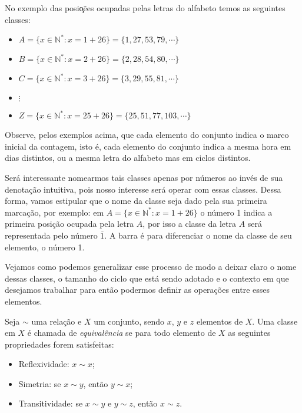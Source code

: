 No exemplo das posi\c{o}\~{e}es ocupadas pelas letras do alfabeto temos as seguintes classes: 

\begin{itemize}
	\item $A=\{x\in\mathbb{N^*}: x=1+26\}=\{1, 27, 53, 79, \cdots\}$ 
	\item $B=\{x\in\mathbb{N^*}: x=2+26\}=\{2, 28, 54, 80, \cdots\}$
	\item $C=\{x\in\mathbb{N^*}: x=3+26\}=\{3, 29, 55, 81, \cdots\}$
	\item $\vdots$
	\item $Z=\{x\in\mathbb{N^*}: x=25+26\}=\{25, 51, 77, 103, \cdots\}$
\end{itemize}

Observe, pelos exemplos acima, que cada elemento do conjunto indica o marco inicial da contagem, isto \'{e}, cada elemento do conjunto indica a mesma hora em dias distintos, ou a mesma letra do alfabeto mas em ciclos distintos.

Ser\'{a} interessante nomearmos tais classes apenas por n\'{u}meros ao inv\'{e}s de sua denota\c{c}\~{a}o intuitiva, pois nosso interesse ser\'{a} operar com essas classes. Dessa forma, vamos estipular que o nome da classe seja dado pela sua 
primeira marca\c{c}\~{a}o, por exemplo: em $A=\{x\in\mathbb{N^*}: x=1+26\}$ o n\'{u}mero 1 indica a primeira posi\c{c}\~{a}o ocupada pela letra $A$, por isso a classe da letra $A$ ser\'{a} representada pelo n\'{u}mero $\overline{1}$. A barra \'{e} 
para diferenciar o nome da classe de seu elemento, o n\'{u}mero 1. 

Vejamos como podemos generalizar esse processo de modo a deixar claro o nome dessas classes, o tamanho do ciclo que est\'a sendo adotado 
e o contexto em que desejamos trabalhar para ent\~{a}o podermos definir as opera\c{c}\~{o}es entre esses elementos.
 

\begin{Df}
	Seja $\sim$ uma rela\c{c}\~{a}o e $X$ um conjunto, sendo $x$, $y$ e $z$ elementos de $X$. 
	Uma classe em $X$ \'{e} chamada de \textsl{equival\^{e}ncia} se 
	para todo elemento de $X$ as seguintes propriedades forem satisfeitas:
	\begin{itemize}
		\item Reflexividade: $x\sim x$; 		
		\item Simetria: se $x\sim y$, ent\~{a}o $y\sim x$; 
		\item Transitividade: se $x\sim y$ e $y\sim z$, ent\~{a}o $x\sim z$.
	\end{itemize}
\end{Df}   
	
